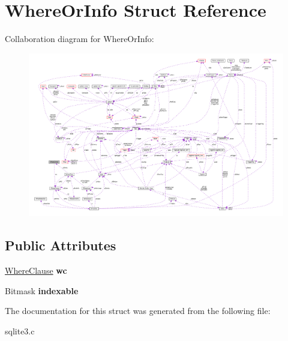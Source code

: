 \hypertarget{structWhereOrInfo}{}\section{Where\+Or\+Info Struct Reference}
\label{structWhereOrInfo}


Collaboration diagram for Where\+Or\+Info\+:\nopagebreak
\begin{figure}[H]
\begin{center}
\leavevmode
\includegraphics[width=350pt]{structWhereOrInfo__coll__graph}
\end{center}
\end{figure}
\subsection*{Public Attributes}
\begin{DoxyCompactItemize}
\item 
\hyperlink{structWhereClause}{Where\+Clause} {\bfseries wc}\hypertarget{structWhereOrInfo_a45bb04e5ea24ec549f060bc8b210ec71}{}\label{structWhereOrInfo_a45bb04e5ea24ec549f060bc8b210ec71}

\item 
Bitmask {\bfseries indexable}\hypertarget{structWhereOrInfo_a39777f291e1e516f01b05b71a9805357}{}\label{structWhereOrInfo_a39777f291e1e516f01b05b71a9805357}

\end{DoxyCompactItemize}


The documentation for this struct was generated from the following file\+:\begin{DoxyCompactItemize}
\item 
sqlite3.\+c\end{DoxyCompactItemize}
